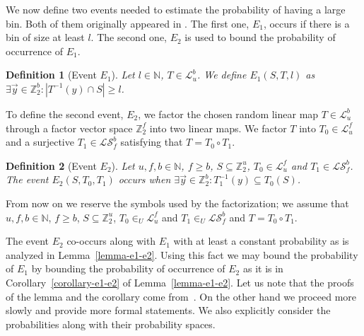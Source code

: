 \documentclass{article}
\newcommand{\vecspace}[2]{\mathbb{Z}_{#1}^{#2}}
\newcommand{\binvecspace}[1]{\vecspace{2}{#1}}
\newcommand{\linearmaps}[2]{\mathcal{L}_{#1}^{#2}}
\newcommand{\surjectivelinearmaps}[2]{\mathcal{LS}_{#1}^{#2}}
\newtheorem{definition}{Definition}
\begin{document}
We now define two events needed to estimate the probability of having a large bin. 
Both of them originally appeared in \cite{alonetal}.
The first one, $E_1$, occurs if there is a bin of size at least $l$.
The second one, $E_2$ is used to bound the probability of occurrence of  $E_1$.
\begin{definition}[Event $E_1$]
Let $l \in \mathbb{N}$, $T \in \linearmaps{u}{b}$. We define $E_1(S, T, l)$ as $\exists \vec{y} \in \binvecspace{b} \colon |T^{-1}(y) \cap S| \geq l$.
\end{definition}

To define the second event, $E_2$, we factor the chosen random linear map $T \in \linearmaps{u}{b}$ through a factor vector space $\binvecspace{f}$ into two linear maps.
We factor $T$ into $T_0 \in \linearmaps{u}{f}$ and a surjective $T_1 \in \surjectivelinearmaps{f}{b}$ satisfying that $T = T_0 \circ T_1$.

\begin{definition}[Event $E_2$]
Let $u, f, b \in \mathbb{N}$, $f \geq b$, $S \subseteq \binvecspace{u}$, $T_0 \in \linearmaps{u}{f}$ and $T_1 \in \surjectivelinearmaps{f}{b}$.
The event $E_2(S, T_0, T_1)$ occurs when $\exists \vec{y} \in \binvecspace{b} \colon T_1^{-1}(y) \subseteq T_0(S)$.
\end{definition}

From now on we reserve the symbols used by the factorization; we assume that $u, f, b \in \mathbb{N}$, $f \geq b$, $S \subseteq \binvecspace{u}$, $T_0 \in_U \linearmaps{u}{f}$ and $T_1 \in_U \surjectivelinearmaps{f}{b}$ and $T = T_0 \circ T_1$.

The event $E_2$ co-occurs along with $E_1$ with at least a constant probability as is analyzed in Lemma~\ref{lemma-e1-e2}. 
Using this fact we may bound the probability of $E_1$ by bounding the probability of occurrence of $E_2$ as it is in Corollary~\ref{corollary-e1-e2} of Lemma~\ref{lemma-e1-e2}.
Let us note that the proofs of the lemma and the corollary come from~\cite{alonetal}.
On the other hand we proceed more slowly and provide more formal statements.
We also explicitly consider the probabilities along with their probability spaces.
\end{document}
